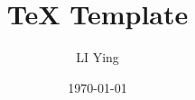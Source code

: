 \documentclass[a4paper,12pt]{report}
\author{LI Ying}
\date{\today}
\title{TeX Template}
\begin{document}
\maketitle
\tableofcontents
\pagebreak


\end{document}
